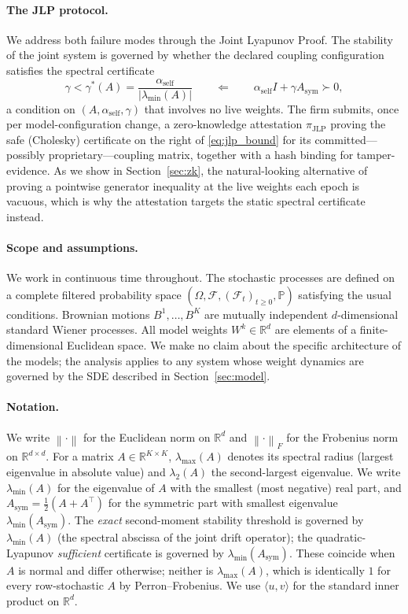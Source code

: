 \documentclass[12pt]{article}
\theoremstyle{plain}
\theoremstyle{definition}
\newcommand{\R}{\mathbb{R}}
\newcommand{\Prob}{\mathbb{P}}
\newcommand{\norm}[1]{\left\lVert #1 \right\rVert}
\newcommand{\abs}[1]{\left| #1 \right|}
\newcommand{\ip}[2]{\langle #1, #2 \rangle}
\begin{document}
\paragraph{The JLP protocol.}
We address both failure modes through the Joint Lyapunov Proof.  The
stability of the joint system is governed by whether the declared coupling
configuration satisfies the spectral certificate
\begin{equation}
  \gamma < \gamma^*(A) = \frac{\alpha_{\mathrm{self}}}{\abs{\lambda_{\min}(A)}}
  \qquad\Longleftarrow\qquad
  \alpha_{\mathrm{self}} I + \gamma A_{\mathrm{sym}}\succ0,
  \label{eq:jlp_bound}
\end{equation}
a condition on $(A,\alpha_{\mathrm{self}},\gamma)$ that involves no live
weights.  The firm submits, once per model-configuration change, a
zero-knowledge attestation $\pi_{\mathrm{JLP}}$ proving the safe (Cholesky)
certificate on the right of \eqref{eq:jlp_bound} for its committed---possibly
proprietary---coupling matrix, together with a hash binding for
tamper-evidence.  As we show in Section~\ref{sec:zk}, the natural-looking
alternative of proving a pointwise generator inequality at the live weights
each epoch is vacuous, which is why the attestation targets the static
spectral certificate instead.

\paragraph{Scope and assumptions.}
We work in continuous time throughout.  The stochastic processes are
defined on a complete filtered probability space
$(\Omega, \mathcal{F}, (\mathcal{F}_t)_{t\geq 0}, \Prob)$ satisfying the
usual conditions.  Brownian motions $B^1, \ldots, B^K$ are mutually
independent $d$-dimensional standard Wiener processes.  All model weights
$W^k \in \R^d$ are elements of a finite-dimensional Euclidean space.
We make no claim about the specific architecture of the models; the
analysis applies to any system whose weight dynamics are governed by the
SDE described in Section~\ref{sec:model}.

\paragraph{Notation.}
We write $\norm{\cdot}$ for the Euclidean norm on $\R^d$ and
$\norm{\cdot}_F$ for the Frobenius norm on $\R^{d \times d}$.
For a matrix $A \in \R^{K \times K}$, $\lambda_{\max}(A)$ denotes its
spectral radius (largest eigenvalue in absolute value) and $\lambda_2(A)$
the second-largest eigenvalue.  We write $\lambda_{\min}(A)$ for the
eigenvalue of $A$ with the smallest (most negative) real part, and
$A_{\mathrm{sym}}=\tfrac12(A+A^\top)$ for the symmetric part with smallest
eigenvalue $\lambda_{\min}(A_{\mathrm{sym}})$.  The \emph{exact} second-moment
stability threshold is governed by $\lambda_{\min}(A)$ (the spectral
abscissa of the joint drift operator); the quadratic-Lyapunov \emph{sufficient}
certificate is governed by $\lambda_{\min}(A_{\mathrm{sym}})$.  These
coincide when $A$ is normal and differ otherwise; neither is
$\lambda_{\max}(A)$, which is identically $1$ for every row-stochastic $A$
by Perron--Frobenius.  We use $\ip{u}{v}$ for the standard inner product
on $\R^d$.
\end{document}
